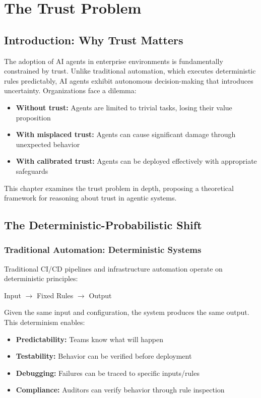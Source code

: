 \chapter{The Trust Problem}
\label{ch:trust-problem}


\section{Introduction: Why Trust Matters}
\label{sec:trust-matters}

The adoption of AI agents in enterprise environments is fundamentally constrained by trust. Unlike traditional automation, which executes deterministic rules predictably, AI agents exhibit autonomous decision-making that introduces uncertainty. Organizations face a dilemma:

\begin{itemize}
    \item \textbf{Without trust:} Agents are limited to trivial tasks, losing their value proposition
    \item \textbf{With misplaced trust:} Agents can cause significant damage through unexpected behavior
    \item \textbf{With calibrated trust:} Agents can be deployed effectively with appropriate safeguards
\end{itemize}

This chapter examines the trust problem in depth, proposing a theoretical framework for reasoning about trust in agentic systems.

\section{The Deterministic-Probabilistic Shift}
\label{sec:deterministic-probabilistic}

\subsection{Traditional Automation: Deterministic Systems}
\label{subsec:deterministic-systems}

Traditional CI/CD pipelines and infrastructure automation operate on deterministic principles:

\begin{center}
Input $\rightarrow$ Fixed Rules $\rightarrow$ Output
\end{center}

Given the same input and configuration, the system produces the same output. This determinism enables:
\begin{itemize}
    \item \textbf{Predictability:} Teams know what will happen
    \item \textbf{Testability:} Behavior can be verified before deployment
    \item \textbf{Debugging:} Failures can be traced to specific inputs/rules
    \item \textbf{Compliance:} Auditors can verify behavior through rule inspection
\end{itemize}

